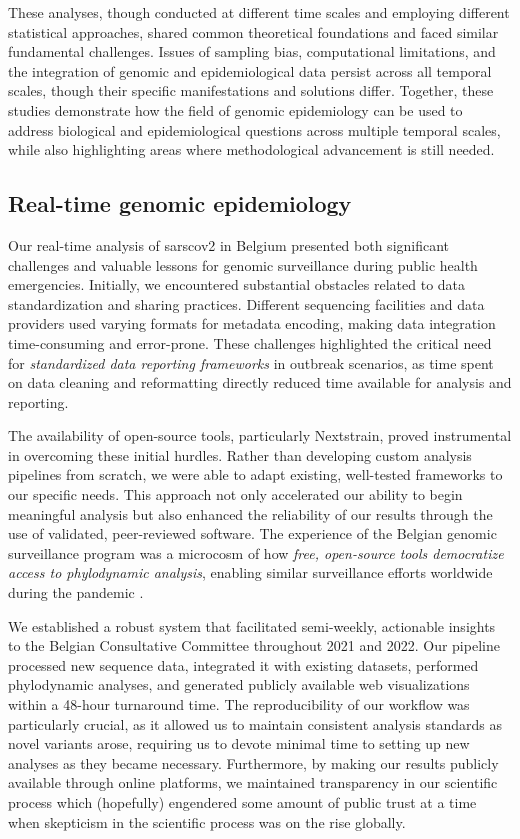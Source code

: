 These analyses, though conducted at different time scales and employing different statistical approaches, shared common theoretical foundations and faced similar fundamental challenges.
Issues of sampling bias, computational limitations, and the integration of genomic and epidemiological data persist across all temporal scales, though their specific manifestations and solutions differ.
Together, these studies demonstrate how the field of genomic epidemiology can be used to address biological and epidemiological questions across multiple temporal scales, while also highlighting areas where methodological advancement is still needed.

\subsection{Real-time genomic epidemiology}
Our real-time analysis of \gls{sarscov2} in Belgium presented both significant challenges and valuable lessons for genomic surveillance during public health emergencies.
Initially, we encountered substantial obstacles related to data standardization and sharing practices.
Different sequencing facilities and data providers used varying formats for metadata encoding, making data integration time-consuming and error-prone.
These challenges highlighted the critical need for \textit{standardized data reporting frameworks} in outbreak scenarios, as time spent on data cleaning and reformatting directly reduced time available for analysis and reporting.

The availability of open-source tools, particularly Nextstrain, proved instrumental in overcoming these initial hurdles.
Rather than developing custom analysis pipelines from scratch, we were able to adapt existing, well-tested frameworks to our specific needs.
This approach not only accelerated our ability to begin meaningful analysis but also enhanced the reliability of our results through the use of validated, peer-reviewed software.
The experience of the Belgian genomic surveillance program was a microcosm of how \textit{free, open-source tools democratize access to phylodynamic analysis}, enabling similar surveillance efforts worldwide during the pandemic \citep{hodcroft2021spread,sahadeo2023implementation}.

We established a robust system that facilitated semi-weekly, actionable insights to the Belgian Consultative Committee throughout 2021 and 2022.
Our pipeline processed new sequence data, integrated it with existing datasets, performed phylodynamic analyses, and generated publicly available web visualizations within a 48-hour turnaround time.
The reproducibility of our workflow was particularly crucial, as it allowed us to maintain consistent analysis standards as novel variants arose, requiring us to devote minimal time to setting up new analyses as they became necessary.
Furthermore, by making our results publicly available through online platforms, we maintained transparency in our scientific process which (hopefully) engendered some amount of public trust at a time when skepticism in the scientific process was on the rise globally.

